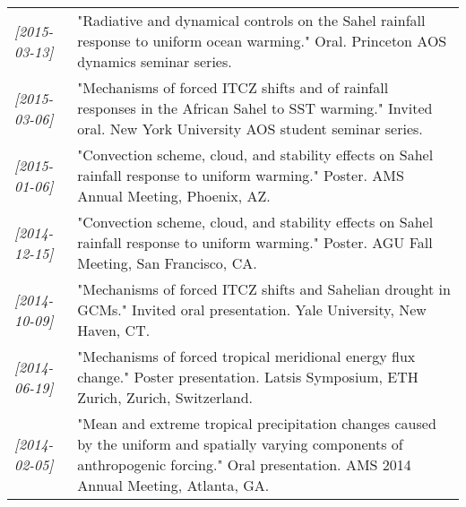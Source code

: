 \documentclass[12pt,letterpaper]{shillcv}
\begin{document}
\begin{center}
\begin{tabularx}{\textwidth}{lX}
\textit{[2015-03-13]} & "Radiative and dynamical controls on the Sahel rainfall response to uniform ocean warming."  Oral.  Princeton AOS dynamics seminar series.\\
\textit{[2015-03-06]} & "Mechanisms of forced ITCZ shifts and of rainfall responses in the African Sahel to SST warming."  Invited oral.  New York University AOS student seminar series.\\
\textit{[2015-01-06]} & "Convection scheme, cloud, and stability effects on Sahel rainfall response to uniform warming."  Poster.  AMS Annual Meeting, Phoenix, AZ.\\
\textit{[2014-12-15]} & "Convection scheme, cloud, and stability effects on Sahel rainfall response to uniform warming."  Poster.  AGU Fall Meeting, San Francisco, CA.\\
\textit{[2014-10-09]} & "Mechanisms of forced ITCZ shifts and Sahelian drought in GCMs."  Invited oral presentation.  Yale University, New Haven, CT.\\
\textit{[2014-06-19]} & "Mechanisms of forced tropical meridional energy flux change."  Poster presentation.  Latsis Symposium, ETH Zurich, Zurich, Switzerland.\\
\textit{[2014-02-05]} & "Mean and extreme tropical precipitation changes caused by the uniform and spatially varying components of anthropogenic forcing."  Oral presentation.  AMS 2014 Annual Meeting, Atlanta, GA.\\
\end{tabularx}
\end{center}
\end{document}
